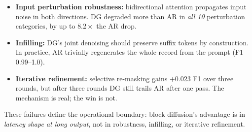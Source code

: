 \begin{itemize}[nosep]
\item \textbf{Input perturbation robustness:} bidirectional attention
  propagates input noise in both directions. DG degraded more than AR
  in \emph{all 10} perturbation categories, by up to $8.2\times$ the AR
  drop.
\item \textbf{Infilling:} DG's joint denoising should preserve suffix
  tokens by construction. In practice, AR trivially regenerates the
  whole record from the prompt (F1 0.99--1.0).
\item \textbf{Iterative refinement:} selective re-masking gains
  $+0.023$ F1 over three rounds, but after three rounds DG still trails
  AR after one pass. The mechanism is real; the win is not.
\end{itemize}
These failures define the operational boundary: block diffusion's
advantage is in \emph{latency shape at long output}, not in robustness,
infilling, or iterative refinement.
